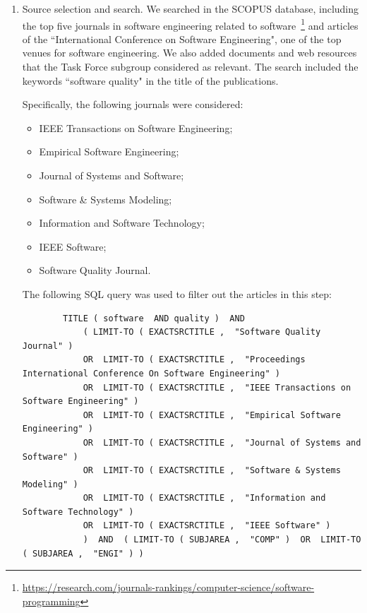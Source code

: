 \begin{enumerate}
    \item Source selection and search. We searched in the SCOPUS database, including the top five journals in software engineering related to software~\footnote{\url{https://research.com/journals-rankings/computer-science/software-programming}} and articles of the  ``International Conference on Software Engineering", one of the top venues for software engineering. We also added documents and web resources that the Task Force subgroup considered as relevant. The search included the keywords ``software quality" in the title of the publications.

    Specifically, the following journals were considered:
    \begin{itemize}
        \item IEEE Transactions on Software Engineering;
        \item Empirical Software Engineering;
        \item Journal of Systems and Software;
        \item Software \& Systems Modeling;
        \item Information and Software Technology;
        \item IEEE Software;
        \item Software Quality Journal.
    \end{itemize}

    The following SQL query was used to filter out the articles in this step:
    \begin{tiny}
    \begin{verbatim}
        TITLE ( software  AND quality )  AND  
            ( LIMIT-TO ( EXACTSRCTITLE ,  "Software Quality Journal" )  
            OR  LIMIT-TO ( EXACTSRCTITLE ,  "Proceedings International Conference On Software Engineering" ) 
            OR  LIMIT-TO ( EXACTSRCTITLE ,  "IEEE Transactions on Software Engineering" )
            OR  LIMIT-TO ( EXACTSRCTITLE ,  "Empirical Software Engineering" ) 
            OR  LIMIT-TO ( EXACTSRCTITLE ,  "Journal of Systems and Software" ) 
            OR  LIMIT-TO ( EXACTSRCTITLE ,  "Software & Systems Modeling" ) 
            OR  LIMIT-TO ( EXACTSRCTITLE ,  "Information and Software Technology" )  
            OR  LIMIT-TO ( EXACTSRCTITLE ,  "IEEE Software" )   
            )  AND  ( LIMIT-TO ( SUBJAREA ,  "COMP" )  OR  LIMIT-TO ( SUBJAREA ,  "ENGI" ) )  
    \end{verbatim}
    \end{tiny}


\end{enumerate}

